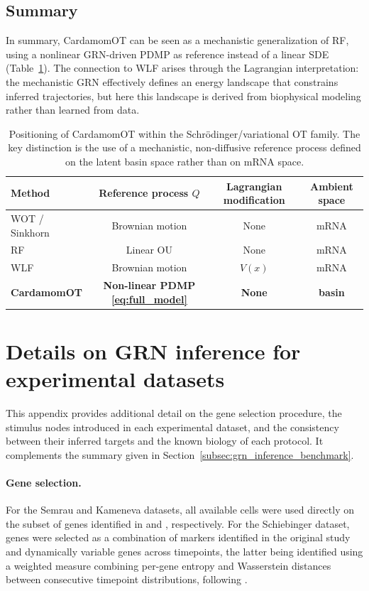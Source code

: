 \documentclass[a4paper, 11pt]{article}
\theoremstyle{plain}
\theoremstyle{remark}
\newcommand*{\firstreview}[1]{{\color{black}#1}}
\begin{document}
\begin{appendices}
\subsection{Summary}

In summary, CardamomOT can be seen as a mechanistic generalization of \firstreview{RF}, using a nonlinear GRN-driven PDMP as reference instead of a linear SDE (Table~\ref{tab:tab1}). The connection to WLF arises through the Lagrangian interpretation: the mechanistic GRN effectively defines an energy landscape that constrains inferred trajectories, but here this landscape is derived from biophysical modeling rather than learned from data.

\begin{table}[h]
\centering
\begin{tabular}{lccc}
\toprule
Method & Reference process $Q$ & Lagrangian modification & Ambient space \\
\midrule
WOT / Sinkhorn~\cite{schiebinger2019optimal} & Brownian motion & None & mRNA \\
\firstreview{RF}~\cite{zhang2024joint} & Linear OU & None & mRNA \\
WLF~\cite{neklyudov2023computational} & Brownian motion & $V(x)$ & mRNA \\
\textbf{CardamomOT} & \textbf{Non-linear PDMP \eqref{eq:full_model}} & \textbf{None} & \textbf{basin} \\
\bottomrule
\end{tabular}
\caption{Positioning of CardamomOT within the Schrödinger/variational OT family. The key distinction is the use of a mechanistic, non-diffusive reference process defined on the latent basin space rather than on mRNA space.}
\label{tab:tab1}
\end{table}

\section{Details on GRN inference for experimental datasets}
\label{supp_experimental}

This appendix provides additional detail on the gene selection procedure, the 
stimulus nodes introduced in each experimental dataset, and the consistency 
between their inferred targets and the known biology of each protocol. It 
complements the summary given in Section~\ref{subsec:grn_inference_benchmark}.

\paragraph{Gene selection.} For the Semrau and Kameneva datasets, all available 
cells were used directly on the subset of genes identified in 
\cite{ventre2023one} and \cite{gandrillon2025inferring}, respectively. For the 
Schiebinger dataset, genes were selected as a combination of markers identified 
in the original study \cite{schiebinger2019optimal} and dynamically variable 
genes across timepoints, the latter being identified using a weighted measure 
combining per-gene entropy and Wasserstein distances between consecutive 
timepoint distributions, following \cite{gandrillon2025inferring}.


\end{appendices}
\end{document}
